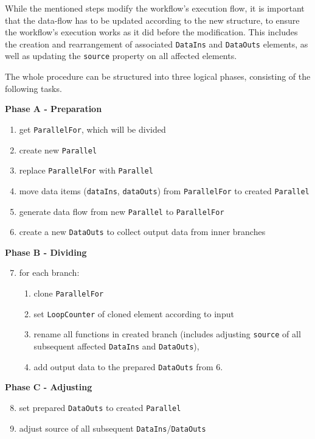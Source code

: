 \documentclass[a4paper,top=25mm,bottom=25mm,12pt,pdftex,halfparskip,twoside,bibtotoc,numbers=noenddot]{scrbook}
\begin{document}
While the mentioned steps modify the workflow's execution flow, it is important that the data-flow has to be updated according to the new structure, to ensure the workflow's execution works as it did before the modification. This includes the creation and rearrangement of associated \texttt{DataIns} and \texttt{DataOuts} elements, as well as updating the \texttt{source} property on all affected elements. 

The whole procedure can be structured into three logical phases, consisting of the following tasks.

\textbf{Phase A - Preparation}
\begin{enumerate}
\item get \texttt{ParallelFor}, which will be divided
\item create new \texttt{Parallel}
\item replace \texttt{ParallelFor} with \texttt{Parallel}
\item move data items (\texttt{dataIns}, \texttt{dataOuts}) from \texttt{ParallelFor} to created \texttt{Parallel}
\item generate data flow from new \texttt{Parallel} to \texttt{ParallelFor}
\item create a new \texttt{DataOuts} to collect output data from inner branches
\end{enumerate}

\textbf{Phase B - Dividing}
\begin{enumerate}
\setcounter{enumi}{6}
\item for each branch:
\begin{enumerate}
\item clone \texttt{ParallelFor}
\item set \texttt{LoopCounter} of cloned element according to input
\item rename all functions in created branch (includes adjusting \texttt{source} of all subsequent affected \texttt{DataIns} and \texttt{DataOuts}), 
\item add output data to the prepared \texttt{DataOuts} from 6.
\end{enumerate}
\end{enumerate}

\textbf{Phase C - Adjusting}
\begin{enumerate}
\setcounter{enumi}{7}
\item set prepared \texttt{DataOuts} to created \texttt{Parallel}
\item adjust source of all subsequent \texttt{DataIns}/\texttt{DataOuts}
\end{enumerate}
\end{document}

